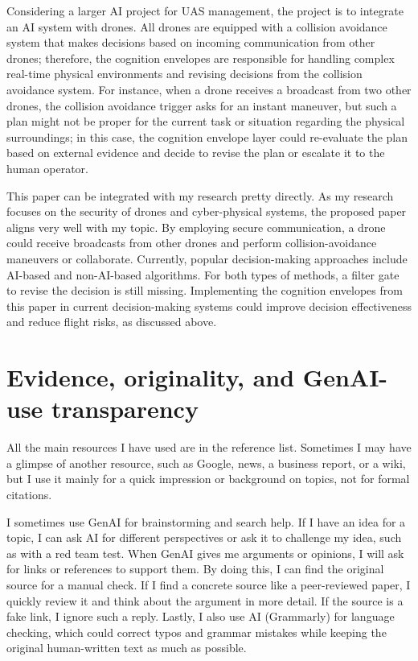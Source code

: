\documentclass[11pt]{article}
\begin{document}
Considering a larger AI project for UAS management, the project is to integrate an AI system with drones. All drones are equipped with a collision avoidance system that makes decisions based on incoming communication from other drones; therefore, the cognition envelopes are responsible for handling complex real-time physical environments and revising decisions from the collision avoidance system. For instance, when a drone receives a broadcast from two other drones, the collision avoidance trigger asks for an instant maneuver, but such a plan might not be proper for the current task or situation regarding the physical surroundings; in this case, the cognition envelope layer could re-evaluate the plan based on external evidence and decide to revise the plan or escalate it to the human operator. 

This paper can be integrated with my research pretty directly. As my research focuses on the security of drones and cyber-physical systems, the proposed paper aligns very well with my topic. By employing secure communication, a drone could receive broadcasts from other drones and perform collision-avoidance maneuvers or collaborate. Currently, popular decision-making approaches include AI-based and non-AI-based algorithms. For both types of methods, a filter gate to revise the decision is still missing. Implementing the cognition envelopes from this paper in current decision-making systems could improve decision effectiveness and reduce flight risks, as discussed above.

\section{Evidence, originality, and GenAI-use transparency}
All the main resources I have used are in the reference list. Sometimes I may have a glimpse of another resource, such as Google, news, a business report, or a wiki, but I use it mainly for a quick impression or background on topics, not for formal citations.

I sometimes use GenAI for brainstorming and search help. If I have an idea for a topic, I can ask AI for different perspectives or ask it to challenge my idea, such as with a red team test. When GenAI gives me arguments or opinions, I will ask for links or references to support them. By doing this, I can find the original source for a manual check. If I find a concrete source like a peer-reviewed paper, I quickly review it and think about the argument in more detail. If the source is a fake link, I ignore such a reply. Lastly, I also use AI (Grammarly) for language checking, which could correct typos and grammar mistakes while keeping the original human-written text as much as possible. 
\end{document}
